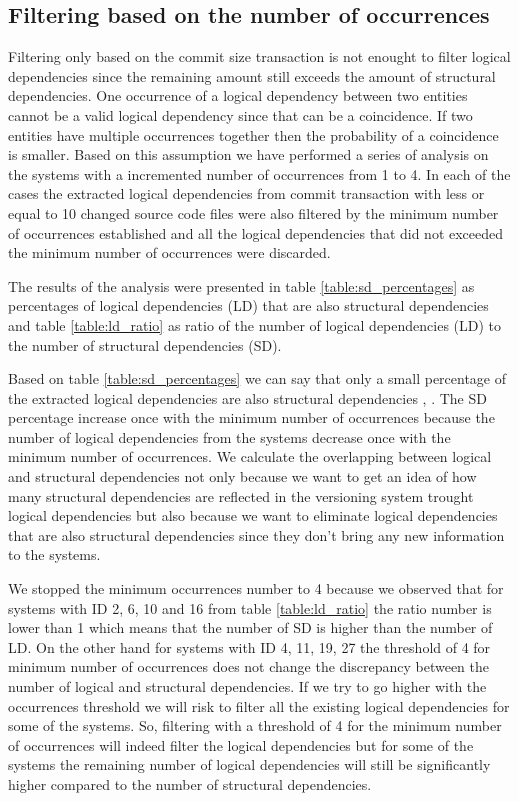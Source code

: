 \documentclass[conference]{IEEEtran}
\begin{document}
\subsection{Filtering based on the number of occurrences}
\label{sec:filterocc}
Filtering only based on the commit size transaction is not enought to filter logical dependencies since the remaining amount still exceeds the amount of structural dependencies.
One occurrence of a logical dependency between two entities cannot be a valid logical dependency since that can be a coincidence. If two entities have multiple occurrences together then the probability of a coincidence is smaller.
Based on this assumption we have performed a series of analysis on the systems with a incremented number of occurrences from 1 to 4. In each of the cases the extracted logical dependencies from commit transaction with less or equal to 10 changed source code files were also filtered by the minimum number of occurrences established and all the logical dependencies that did not exceeded the minimum number of occurrences were discarded. 

The results of the analysis were presented in table \ref{table:sd_percentages} as percentages of logical dependencies (LD) that are also structural dependencies and table \ref{table:ld_ratio} as ratio of the number of logical dependencies (LD) to the number of structural dependencies (SD).

Based on table \ref{table:sd_percentages} we can say that only a small percentage of the extracted logical dependencies are also structural dependencies \cite{DBLP:journals/jss/AjienkaC17}, \cite{DBLP:journals/ese/AjienkaCC18}. The SD percentage increase once with the minimum number of occurrences because the number of logical dependencies from the systems decrease once with the minimum number of occurrences. 
We calculate the overlapping between logical and structural dependencies not only because we want to get an idea of how many structural dependencies are reflected in the versioning system trought logical dependencies but also because we want to eliminate logical dependencies that are also structural dependencies since they don't bring any new information to the systems.

We stopped the minimum occurrences number to 4 because we observed that for systems with ID 2, 6, 10 and 16 from table \ref{table:ld_ratio} the ratio number is lower than 1 which means that the number of SD is higher than the number of LD. On the other hand for systems with ID 4, 11, 19, 27 the threshold of 4 for minimum number of occurrences does not change the discrepancy between the number of logical and structural dependencies.
If we try to go higher with the occurrences threshold we will risk to filter all the existing logical dependencies for some of the systems.
So, filtering with a threshold of 4 for the minimum number of occurrences will indeed filter the logical dependencies but for some of the systems the remaining number of logical dependencies will still be significantly higher compared to the number of structural dependencies.
\end{document}
